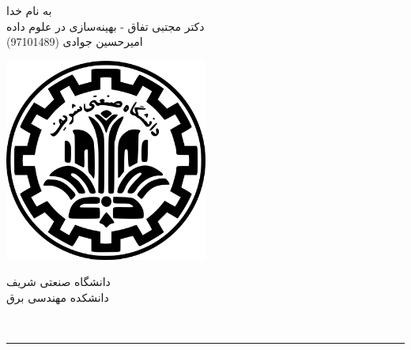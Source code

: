 \documentclass[a4paper]{article}
\begin{document}
\begin{minipage}{0.6\textwidth}
\begin{bf}
\begin{center}
	\large
	به نام خدا\\
دکتر مجتبی تفاق - بهینه‌سازی در علوم داده \\
\Large
\vspace{0.4cm}
امیرحسین جوادی (97101489)
\end{center}
\end{bf}
\normalsize
\end{minipage} \hfill
\begin{minipage}{0.35\textwidth}
\begin{flushleft}
\includegraphics[width=0.5\textwidth]{logo.png}
\end{flushleft}
\begin{flushleft}
	دانشگاه صنعتی شریف\\
	دانشکده مهندسی برق\\
\end{flushleft}

\end{minipage}
\\
\rule[0.1\baselineskip]{\textwidth}{1pt}
\end{document}
